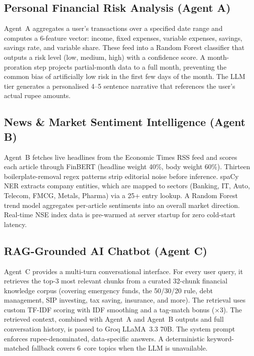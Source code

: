 \documentclass[12pt,a4paper]{article}
\begin{document}
\subsection{Personal Financial Risk Analysis (Agent A)}
Agent~A aggregates a user's transactions over a specified date range and computes a 6-feature vector: income, fixed expenses, variable expenses, savings, savings rate, and variable share. These feed into a Random Forest classifier that outputs a risk level (low, medium, high) with a confidence score. A month-proration step projects partial-month data to a full month, preventing the common bias of artificially low risk in the first few days of the month. The LLM tier generates a personalised 4--5 sentence narrative that references the user's actual rupee amounts.

\subsection{News \& Market Sentiment Intelligence (Agent B)}
Agent~B fetches live headlines from the Economic Times RSS feed and scores each article through FinBERT (headline weight 40\%, body weight 60\%). Thirteen boilerplate-removal regex patterns strip editorial noise before inference. spaCy NER extracts company entities, which are mapped to sectors (Banking, IT, Auto, Telecom, FMCG, Metals, Pharma) via a 25+ entry lookup. A Random Forest trend model aggregates per-article sentiments into an overall market direction. Real-time NSE index data is pre-warmed at server startup for zero cold-start latency.

\subsection{RAG-Grounded AI Chatbot (Agent C)}
Agent~C provides a multi-turn conversational interface. For every user query, it retrieves the top-3 most relevant chunks from a curated 32-chunk financial knowledge corpus (covering emergency funds, the 50/30/20 rule, debt management, SIP investing, tax saving, insurance, and more). The retrieval uses custom TF-IDF scoring with IDF smoothing and a tag-match bonus ($\times 3$). The retrieved context, combined with Agent~A and Agent~B outputs and full conversation history, is passed to Groq LLaMA~3.3 70B. The system prompt enforces rupee-denominated, data-specific answers. A deterministic keyword-matched fallback covers 6~core topics when the LLM is unavailable.
\end{document}
